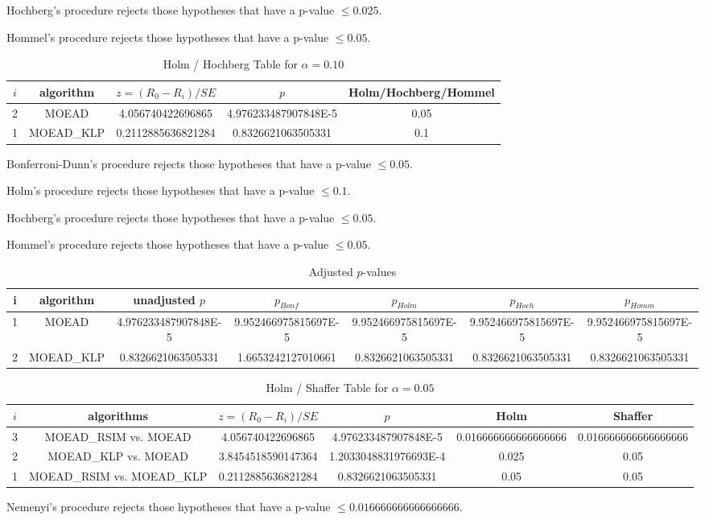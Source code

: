 \documentclass[a4paper,10pt]{article}
\begin{document}
\begin{landscape}
Hochberg's procedure rejects those hypotheses that have a p-value $\le0.025$.


Hommel's procedure rejects those hypotheses that have a p-value $\le0.05$.


\begin{table}[!htp]
\centering\tiny
\caption{Holm / Hochberg Table for $\alpha=0.10$}
\begin{tabular}{ccccc}
$i$&algorithm&$z=(R_0 - R_i)/SE$&$p$&Holm/Hochberg/Hommel\\
\hline
2&MOEAD&4.056740422696865&4.976233487907848E-5&0.05\\
1&MOEAD_KLP&0.2112885636821284&0.8326621063505331&0.1\\
\hline
\end{tabular}
\end{table}
Bonferroni-Dunn's procedure rejects those hypotheses that have a p-value $\le0.05$.


Holm's procedure rejects those hypotheses that have a p-value $\le0.1$.


Hochberg's procedure rejects those hypotheses that have a p-value $\le0.05$.


Hommel's procedure rejects those hypotheses that have a p-value $\le0.05$.


\begin{table}[!htp]
\centering\tiny
\caption{Adjusted $p$-values}
\begin{tabular}{ccccccc}
i&algorithm&unadjusted $p$&$p_{Bonf}$&$p_{Holm}$&$p_{Hoch}$&$p_{Homm}$\\
\hline
1&MOEAD&4.976233487907848E-5&9.952466975815697E-5&9.952466975815697E-5&9.952466975815697E-5&9.952466975815697E-5\\
2&MOEAD_KLP&0.8326621063505331&1.6653242127010661&0.8326621063505331&0.8326621063505331&0.8326621063505331\\
\hline
\end{tabular}
\end{table}

\begin{table}[!htp]
\centering\tiny
\caption{Holm / Shaffer Table for $\alpha=0.05$}
\begin{tabular}{cccccc}
$i$&algorithms&$z=(R_0 - R_i)/SE$&$p$&Holm&Shaffer\\
\hline
3&MOEAD_RSIM vs. MOEAD&4.056740422696865&4.976233487907848E-5&0.016666666666666666&0.016666666666666666\\
2&MOEAD_KLP vs. MOEAD&3.8454518590147364&1.2033048831976693E-4&0.025&0.05\\
1&MOEAD_RSIM vs. MOEAD_KLP&0.2112885636821284&0.8326621063505331&0.05&0.05\\
\hline
\end{tabular}
\end{table}
Nemenyi's procedure rejects those hypotheses that have a p-value $\le0.016666666666666666$.



\end{landscape}
\end{document}
